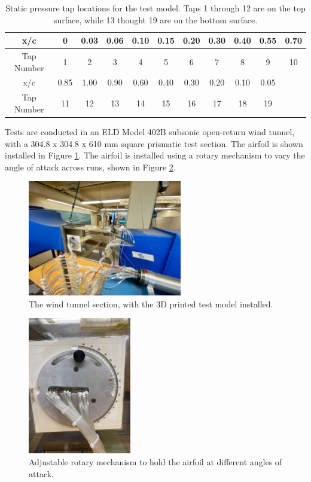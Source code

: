 \documentclass[runningheads]{llncs}
\begin{document}
\begin{table}
    \centering
    \begin{tabular}{|c||c|c|c|c|c|c|c|c|c|c|}\hline
        x/c & 0 & 0.03 & 0.06 & 0.10 & 0.15 & 0.20 & 0.30 & 0.40 & 0.55 & 0.70 \\\hline
        Tap Number & 1 & 2 & 3 & 4 & 5 & 6 & 7 & 8 & 9 & 10\\\hline \hline
        x/c & 0.85 & 1.00 & 0.90 & 0.60 & 0.40 & 0.30 & 0.20 & 0.10 & 0.05&\\\hline
        Tap Number & 11 & 12 & 13 & 14 & 15 & 16 & 17 & 18 & 19&\\\hline
    \end{tabular}
    \caption{Static pressure tap locations for the test model. Taps 1 through 12 are on the top surface, while 13 thought 19 are on the bottom surface.}
    \label{tab:pressure_taps}
\end{table}

Tests are conducted in an ELD Model 402B subsonic open-return wind tunnel, with a 304.8 x 304.8 x 610 mm  square prismatic test section. The airfoil is shown installed in Figure \ref{fig:wind_tunnel_setup}. The airfoil is installed using a rotary mechanism to vary the angle of attack across runs, shown in Figure \ref{fig:aoa_select}.

\begin{figure}
    \centering
    \includegraphics[width=0.6\textwidth]{Apparatus Pictures/wind_tunnel_setup.jpg}
    \caption{The wind tunnel section, with the 3D printed test model installed.}
    \label{fig:wind_tunnel_setup}
\end{figure}

\begin{figure}
    \centering
    \includegraphics[width=0.4\textwidth]{Apparatus Pictures/aoa_selector.jpg}
    \caption{Adjustable rotary mechanism to hold the airfoil at different angles of attack.}
    \label{fig:aoa_select}
\end{figure}
\end{document}
